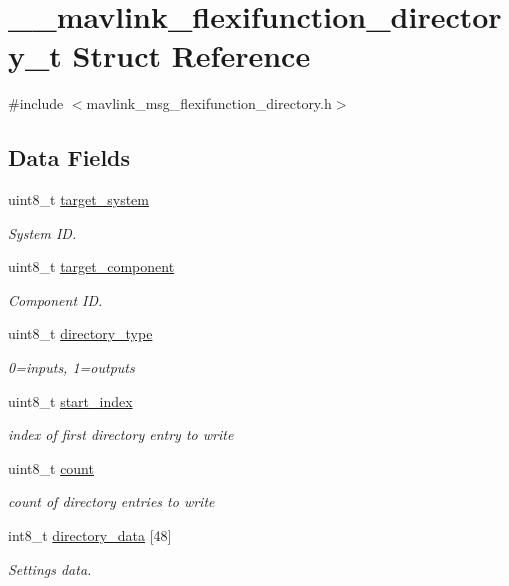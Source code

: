 \hypertarget{struct____mavlink__flexifunction__directory__t}{\section{\+\_\+\+\_\+mavlink\+\_\+flexifunction\+\_\+directory\+\_\+t Struct Reference}
\label{struct____mavlink__flexifunction__directory__t}
}


{\ttfamily \#include $<$mavlink\+\_\+msg\+\_\+flexifunction\+\_\+directory.\+h$>$}

\subsection*{Data Fields}
\begin{DoxyCompactItemize}
\item 
uint8\+\_\+t \hyperlink{struct____mavlink__flexifunction__directory__t_a6847f95c21f1bba64e6aa658b93334ca}{target\+\_\+system}
\begin{DoxyCompactList}\small\item\em System I\+D. \end{DoxyCompactList}\item 
uint8\+\_\+t \hyperlink{struct____mavlink__flexifunction__directory__t_af66137a8469d8019c764f552cd9ff111}{target\+\_\+component}
\begin{DoxyCompactList}\small\item\em Component I\+D. \end{DoxyCompactList}\item 
uint8\+\_\+t \hyperlink{struct____mavlink__flexifunction__directory__t_a8071c733455e53b4480dcd38c119f0a6}{directory\+\_\+type}
\begin{DoxyCompactList}\small\item\em 0=inputs, 1=outputs \end{DoxyCompactList}\item 
uint8\+\_\+t \hyperlink{struct____mavlink__flexifunction__directory__t_a16c5309fb65a5af3b2171ddb619cff3c}{start\+\_\+index}
\begin{DoxyCompactList}\small\item\em index of first directory entry to write \end{DoxyCompactList}\item 
uint8\+\_\+t \hyperlink{struct____mavlink__flexifunction__directory__t_a480e2a30afe256f6037f8deed45a63f7}{count}
\begin{DoxyCompactList}\small\item\em count of directory entries to write \end{DoxyCompactList}\item 
int8\+\_\+t \hyperlink{struct____mavlink__flexifunction__directory__t_a04d49a6254f34e2be44a5bb9dbfa32c5}{directory\+\_\+data} \mbox{[}48\mbox{]}
\begin{DoxyCompactList}\small\item\em Settings data. \end{DoxyCompactList}\end{DoxyCompactItemize}


